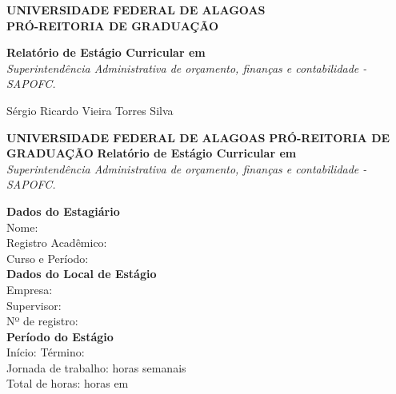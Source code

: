 \documentclass[12pt,a4paper]{article}
\begin{document}
	
	\begin{titlepage}
		\centering
		\large
		\textbf{UNIVERSIDADE FEDERAL DE ALAGOAS} \\
		\textbf{PRÓ-REITORIA DE GRADUAÇÃO} \\
		\vfill
		
		\Huge \textbf{Relatório de Estágio Curricular em} \\
		\vspace{0.5cm}
		\LARGE \textit{Superintendência Administrativa de orçamento, finanças e contabilidade - SAPOFC.} \\
		\vfill
		
		\Large Sérgio Ricardo Vieira Torres Silva \\
		\vspace{1.5cm}
	\end{titlepage}
	
	\thispagestyle{empty}
	\begin{center}
		\textbf{UNIVERSIDADE FEDERAL DE ALAGOAS} 
		\textbf{PRÓ-REITORIA DE GRADUAÇÃO} 
		\vspace{1cm}
		\textbf{Relatório de Estágio Curricular em} \\
		\textit{Superintendência Administrativa de orçamento, finanças e contabilidade - SAPOFC.}
	\end{center}
	
	\vspace{1cm}
	
	\noindent \textbf{Dados do Estagiário} \\
	Nome: \underline{\hspace{12cm}} \\
	Registro Acadêmico: \underline{\hspace{10cm}} \\
	Curso e Período: \underline{\hspace{10cm}} \\
	
	\vspace{0.5cm}
	\noindent \textbf{Dados do Local de Estágio} \\
	Empresa: \underline{\hspace{13cm}} \\
	Supervisor: \underline{\hspace{12cm}} \\
	Nº de registro: \underline{\hspace{10cm}} \\
	
	\vspace{0.5cm}
	\noindent \textbf{Período do Estágio} \\
	Início: \underline{\hspace{4cm}} \quad Término: \underline{\hspace{4cm}} \\
	Jornada de trabalho: \underline{\hspace{5cm}} horas semanais \\
	Total de horas: \underline{\hspace{4cm}} horas em \underline{\hspace{6cm}} \\
	
\end{document}
